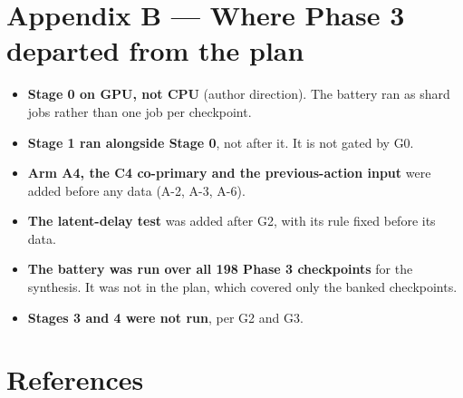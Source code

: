 \documentclass[11pt]{article}
\begin{document}
\section*{Appendix B --- Where Phase 3 departed from the plan}



\begin{itemize}
\item \textbf{Stage 0 on GPU, not CPU} (author direction). The battery ran as shard jobs rather than one job per checkpoint.
\item \textbf{Stage 1 ran alongside Stage 0}, not after it. It is not gated by G0.
\item \textbf{Arm A4, the C4 co-primary and the previous-action input} were added before any data (A-2, A-3, A-6).
\item \textbf{The latent-delay test} was added after G2, with its rule fixed before its data.
\item \textbf{The battery was run over all 198 Phase 3 checkpoints} for the synthesis. It was not in the plan, which covered only the banked checkpoints.
\item \textbf{Stages 3 and 4 were not run}, per G2 and G3.
\end{itemize}



\section*{References}
\end{document}
